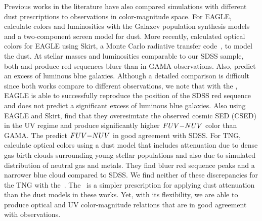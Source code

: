 Previous works in the literature have also compared simulations with different
dust prescriptions to observations in color-magnitude space. For EAGLE, 
\cite{trayford2015} calculate colors and luminosities with the {\sc Galaxev}
population synthesis models and a two-component screen model for dust. More
recently, \cite{trayford2017} calculated optical colors for EAGLE using {\sc
Skirt}, a Monte Carlo radiative transfer code~\citep{camps2015}, to model the
dust. At stellar masses and luminosities comparable to our SDSS sample, both 
\cite{trayford2015} and \cite{trayford2017} produce red sequences bluer than 
in GAMA observations. Also, \cite{trayford2015} predict an excess of luminous 
blue galaxies. Although a detailed comparison is difficult since both works 
compare to different observations, we note that with the \eda, EAGLE is able 
to successfully reproduce the position of the SDSS red sequence and does not 
predict a significant excess of luminous blue galaxies. Also using EAGLE and 
{\sc Skirt}, \cite{baes2019} find that they overesimtate the observed cosmic 
SED (CSED) in the UV regime and produce significantly higher $FUV{-}NUV$ color 
than GAMA. The \eda predict $FUV{-}NUV$ in good agreement with SDSS. 
For TNG, \cite{nelson2018} calculate optical colors using a dust model that
includes attenuation due to dense gas birth clouds surrounding young stellar
populations and also due to simulated distribution of neutral gas and metals.
They find bluer red sequence peaks and a narrower blue cloud compared to SDSS.
We find neither of these discrepancies for the TNG with the~\eda. The
\eda~is a simpler prescription for applying dust attenuation than the dust
models in these works. Yet, with its flexibility, we are able to produce
optical and UV color-magnitude relations that are in good agreement with
observations. 

 

